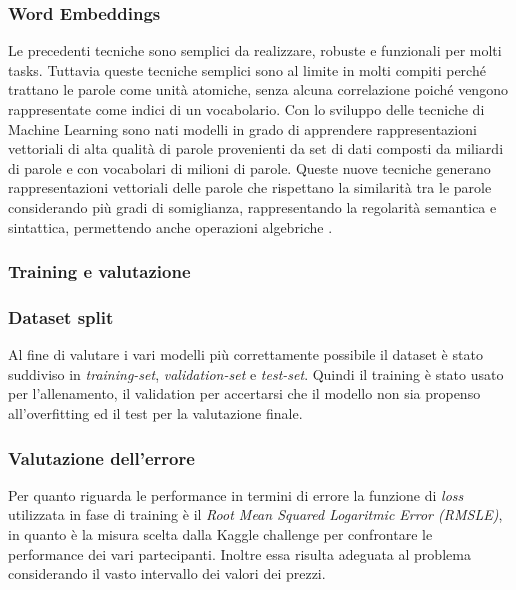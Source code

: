 \subsubsection{Word Embeddings}
Le precedenti tecniche sono semplici da realizzare, robuste e funzionali per molti tasks. Tuttavia queste tecniche semplici sono al limite in molti compiti perché trattano le parole come unità atomiche, senza alcuna correlazione poiché vengono rappresentate come indici di un vocabolario. 
Con lo sviluppo delle tecniche di Machine Learning sono nati modelli in grado di apprendere rappresentazioni vettoriali di alta qualità di parole provenienti da set di dati composti da miliardi di parole e con vocabolari di milioni di parole. Queste nuove tecniche generano rappresentazioni vettoriali delle parole che rispettano la similarità tra le parole considerando più gradi di somiglianza, rappresentando la regolarità semantica e sintattica, permettendo anche operazioni algebriche \cite{mikolov2013efficient}.
\subsubsection{Training e valutazione}

\subsubsection{Dataset split}

Al fine di valutare i vari modelli più correttamente possibile il dataset è
stato suddiviso in \textit{training-set}, \textit{validation-set} e
\textit{test-set}. Quindi il training è stato usato per l'allenamento, il
validation per accertarsi che il modello non sia propenso all'overfitting ed il
test per la valutazione finale.

\subsubsection{Valutazione dell'errore}

Per quanto riguarda le performance in termini di errore la funzione di
\textit{loss} utilizzata in fase di training è il \textit{Root Mean Squared
Logaritmic Error (RMSLE)}, in quanto è la misura scelta dalla Kaggle challenge
per confrontare le performance dei vari partecipanti. Inoltre essa risulta
adeguata al problema considerando il vasto intervallo dei valori dei prezzi.

